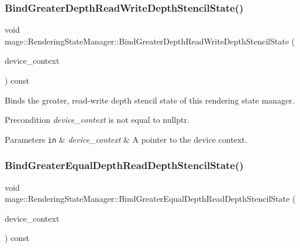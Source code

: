 \subsubsection{\texorpdfstring{Bind\+Greater\+Depth\+Read\+Write\+Depth\+Stencil\+State()}{BindGreaterDepthReadWriteDepthStencilState()}}
{\footnotesize\ttfamily void mage\+::\+Rendering\+State\+Manager\+::\+Bind\+Greater\+Depth\+Read\+Write\+Depth\+Stencil\+State (\begin{DoxyParamCaption}\item[{I\+D3\+D11\+Device\+Context4 $\ast$}]{device\+\_\+context }\end{DoxyParamCaption}) const\hspace{0.3cm}{\ttfamily [noexcept]}}

Binds the greater, read-\/write depth stencil state of this rendering state manager.

\begin{DoxyPrecond}{Precondition}
{\itshape device\+\_\+context} is not equal to {\ttfamily nullptr}. 
\end{DoxyPrecond}

\begin{DoxyParams}[1]{Parameters}
\mbox{\tt in}  & {\em device\+\_\+context} & A pointer to the device context. \\
\hline
\end{DoxyParams}
\hypertarget{classmage_1_1_rendering_state_manager_a746c39e78dc0ede638624f513e4bb380}{}\label{classmage_1_1_rendering_state_manager_a746c39e78dc0ede638624f513e4bb380} 
\subsubsection{\texorpdfstring{Bind\+Greater\+Equal\+Depth\+Read\+Depth\+Stencil\+State()}{BindGreaterEqualDepthReadDepthStencilState()}}
{\footnotesize\ttfamily void mage\+::\+Rendering\+State\+Manager\+::\+Bind\+Greater\+Equal\+Depth\+Read\+Depth\+Stencil\+State (\begin{DoxyParamCaption}\item[{I\+D3\+D11\+Device\+Context4 $\ast$}]{device\+\_\+context }\end{DoxyParamCaption}) const\hspace{0.3cm}{\ttfamily [noexcept]}}


